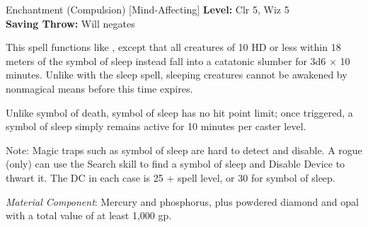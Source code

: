 {Enchantment (Compulsion) [Mind-Affecting]}
{
	\textbf{Level:}
	Clr 5, Wiz 5\\
	\textbf{Saving Throw:}
	Will negates\\
}
{
	This spell functions like , except that all creatures of 10 HD or less within 18 meters of the symbol of sleep instead fall into a catatonic slumber for 3d6 $\times$ 10 minutes. Unlike with the sleep spell, sleeping creatures cannot be awakened by nonmagical means before this time expires.

	Unlike symbol of death, symbol of sleep has no hit point limit; once triggered, a symbol of sleep simply remains active for 10 minutes per caster level.

	Note: Magic traps such as symbol of sleep are hard to detect and disable. A rogue (only) can use the Search skill to find a symbol of sleep and Disable Device to thwart it. The DC in each case is 25 + spell level, or 30 for symbol of sleep.

	\textit{Material Component}:
	Mercury and phosphorus, plus powdered diamond and opal with a total value of at least 1,000 gp.

}
